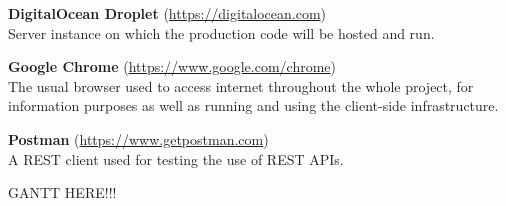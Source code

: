 \begin{addmargin}[1em]{0em}
\textbf{DigitalOcean Droplet} (\url{https://digitalocean.com})\\
Server instance on which the production code will be hosted and run.

\textbf{Google Chrome} (\url{https://www.google.com/chrome})\\
The usual browser used to access internet throughout the whole project, for information purposes as well as running and using the client-side infrastructure.

\textbf{Postman} (\url{https://www.getpostman.com})\\
A REST client used for testing the use of REST APIs.
\end{addmargin}

GANTT HERE!!!